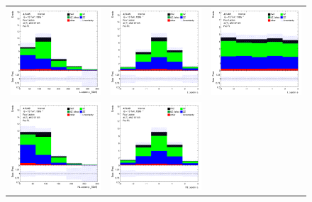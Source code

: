 \begin{figure}[htbp]
  \begin{tabular}{ccc}


    \includegraphics[width=.3\textwidth]{figures/PreFitPlots/lep4_tWZ_4T_SF_L_lepton_pt.png} &
    \includegraphics[width=.3\textwidth]{figures/PreFitPlots/lep4_tWZ_4T_SF_L_lepton_eta.png} &
    \includegraphics[width=.3\textwidth]{figures/PreFitPlots/lep4_tWZ_4T_SF_L_lepton_phi.png} \\
    \includegraphics[width=.3\textwidth]{figures/PreFitPlots/lep4_tWZ_4T_SF_NL_lepton_pt.png} &
    \includegraphics[width=.3\textwidth]{figures/PreFitPlots/lep4_tWZ_4T_SF_NL_lepton_eta.png} &

\end{tabular}
\end{figure}
